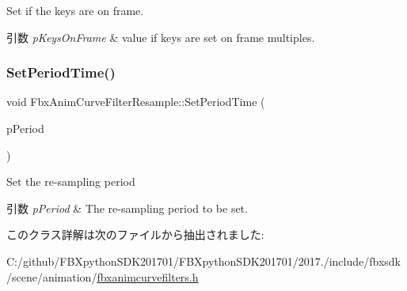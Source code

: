 Set if the keys are on frame. 
\begin{DoxyParams}{引数}
{\em p\+Keys\+On\+Frame} & value if keys are set on frame multiples. \\
\hline
\end{DoxyParams}
\mbox{\label{class_fbx_anim_curve_filter_resample_a1d2369b1cd4a656a79e05b10f7faadd4}} 
\subsubsection{\texorpdfstring{Set\+Period\+Time()}{SetPeriodTime()}}
{\footnotesize\ttfamily void Fbx\+Anim\+Curve\+Filter\+Resample\+::\+Set\+Period\+Time (\begin{DoxyParamCaption}\item[{\hyperlink{class_fbx_time}{Fbx\+Time} \&}]{p\+Period }\end{DoxyParamCaption})}

Set the re-\/sampling period 
\begin{DoxyParams}{引数}
{\em p\+Period} & The re-\/sampling period to be set. \\
\hline
\end{DoxyParams}


このクラス詳解は次のファイルから抽出されました\+:\begin{DoxyCompactItemize}
\item 
C\+:/github/\+F\+B\+Xpython\+S\+D\+K201701/\+F\+B\+Xpython\+S\+D\+K201701/2017./include/fbxsdk/scene/animation/\hyperlink{fbxanimcurvefilters_8h}{fbxanimcurvefilters.\+h}\end{DoxyCompactItemize}

